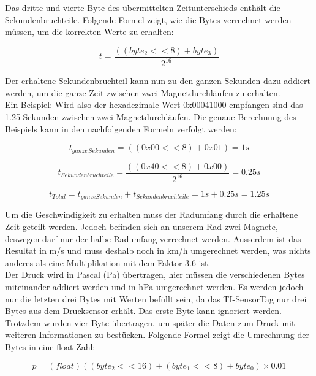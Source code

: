 Das dritte und vierte Byte des übermittelten Zeitunterschieds enthält die Sekundenbruchteile. Folgende Formel zeigt, wie die Bytes verrechnet werden müssen, um die korrekten Werte zu erhalten:

\begin{equation}
	t = \frac{((byte_2 << 8) + byte_3)}{2^{16}}
\end{equation}

Der erhaltene Sekundenbruchteil kann nun zu den ganzen Sekunden dazu addiert werden, um die ganze Zeit zwischen zwei Magnetdurchläufen zu erhalten.\\

Ein Beispiel: Wird also der hexadezimale Wert 0x00041000 empfangen sind das 1.25 Sekunden zwischen zwei Magnetdurchläufen. Die genaue Berechnung des Beispiels kann in den nachfolgenden Formeln verfolgt werden:

\begin{equation}
	t_{ganze\,Sekunden} = ((0x00 << 8) + 0x01) = 1 s
\end{equation}

\begin{equation}
	t_{Sekundenbruchteile} = \frac{((0x40 << 8) + 0x00)}{2^{16}} = 0.25 s
\end{equation}

\begin{equation}
	t_{Total} = t_{ganze Sekunden} + t_{Sekundenbruchteile} = 1 s + 0.25 s = 1.25 s
\end{equation}

Um die Geschwindigkeit zu erhalten muss der Radumfang durch die erhaltene Zeit geteilt werden. Jedoch befinden sich an unserem Rad zwei Magnete, deswegen darf nur der halbe Radumfang verrechnet werden. Ausserdem ist das Resultat in m/s und muss deshalb noch in km/h umgerechnet werden, was nichts anderes als eine Multiplikation mit dem Faktor 3.6 ist.\\

Der Druck wird in Pascal (Pa) übertragen, hier müssen die verschiedenen Bytes miteinander addiert werden und in hPa umgerechnet werden. Es werden jedoch nur die letzten drei Bytes mit Werten befüllt sein, da das TI-SensorTag nur drei Bytes aus dem Drucksensor erhält. Das erste Byte kann ignoriert werden. Trotzdem wurden vier Byte übertragen, um später die Daten zum Druck mit weiteren Informationen zu bestücken. Folgende Formel zeigt die Umrechnung der Bytes in eine float Zahl:

\begin{equation}
	p = (float)((byte_2 << 16) + (byte_1 << 8) + byte_0) \times 0.01
\end{equation}

